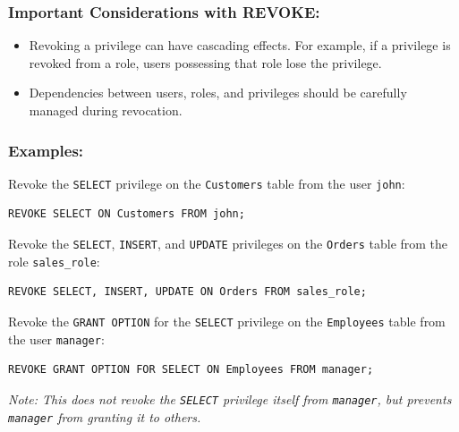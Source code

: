 \documentclass[12pt,a4paper]{article}
\begin{document}
\subsubsection*{Important Considerations with REVOKE:}
\begin{itemize}
    \item Revoking a privilege can have cascading effects. For example, if a privilege is revoked from a role, users possessing that role lose the privilege.
    \item Dependencies between users, roles, and privileges should be carefully managed during revocation.
\end{itemize}

\subsubsection*{Examples:}

Revoke the \texttt{SELECT} privilege on the \texttt{Customers} table from the user \texttt{john}:
\begin{verbatim}
REVOKE SELECT ON Customers FROM john;
\end{verbatim}

Revoke the \texttt{SELECT}, \texttt{INSERT}, and \texttt{UPDATE} privileges on the \texttt{Orders} table from the role \texttt{sales\_role}:
\begin{verbatim}
REVOKE SELECT, INSERT, UPDATE ON Orders FROM sales_role;
\end{verbatim}

Revoke the \texttt{GRANT OPTION} for the \texttt{SELECT} privilege on the \texttt{Employees} table from the user \texttt{manager}:
\begin{verbatim}
REVOKE GRANT OPTION FOR SELECT ON Employees FROM manager;
\end{verbatim}
\textit{Note: This does not revoke the \texttt{SELECT} privilege itself from \texttt{manager}, but prevents \texttt{manager} from granting it to others.}
\end{document}
